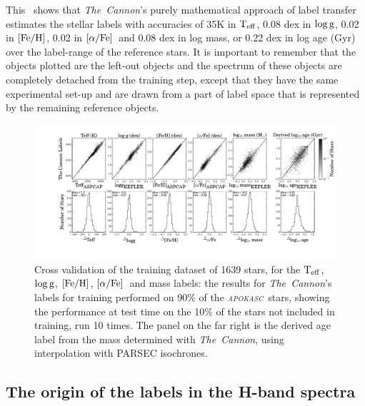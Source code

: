 \documentclass[12pt, preprint]{aastex}
\newcommand{\project}[1]{\textsl{#1}}
\newcommand{\tc}{\project{The~Cannon}}
\newcommand{\apokasc}{\project{\textsc{apokasc}}}
\newcommand{\teff}{\mbox{$\rm T_{eff}$}}
\newcommand{\feh}{\mbox{$\rm [Fe/H]$}}
\newcommand{\alphafe}{\mbox{$\rm [\alpha/Fe]$}}
\newcommand{\logg}{\mbox{$\rm \log g$}}
\begin{document}
This \figurename\ shows that \tc 's purely mathematical approach of label transfer estimates the stellar labels with accuracies of 35K in \teff, 0.08 dex in \logg, 0.02 in \feh, 0.02 in \alphafe\ and  0.08 dex in log mass, or 0.22 dex in log age (Gyr) over the label-range of the reference stars. It is important to remember that the objects plotted are the left-out objects and the spectrum of these objects are completely detached from the training step,  except that they have the same experimental set-up and are drawn from a part of label space that is represented by the remaining reference objects.

\begin{figure}[p]
\centering
        \includegraphics[scale=0.4]{./plots/validation_1639_6_quad.pdf}
  \caption{Cross validation of the training dataset of 1639 stars, for the \teff, \logg, \feh, \alphafe\ and mass labels: the results for \tc's labels for training performed on 90\% of the \apokasc\ stars, showing the performance at test time on the 10\% of the stars not included in training, run 10 times. The panel on the far right is the derived age label from the mass determined with \tc, using interpolation with PARSEC isochrones.}
\label{fig:validation1}
\end{figure}

\subsection{The origin of the labels in the H-band spectra}
\end{document}
